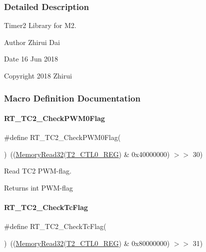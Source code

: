 \subsubsection{Detailed Description}
Timer2 Library for M2. 

\begin{DoxyAuthor}{Author}
Zhirui Dai 
\end{DoxyAuthor}
\begin{DoxyDate}{Date}
16 Jun 2018 
\end{DoxyDate}
\begin{DoxyCopyright}{Copyright}
2018 Zhirui 
\end{DoxyCopyright}


\subsubsection{Macro Definition Documentation}
\mbox{\label{a00047_a68bc636dca2736a8368cfd72ca9eb11a}} 
\paragraph{\texorpdfstring{R\+T\+\_\+\+T\+C2\+\_\+\+Check\+P\+W\+M0\+Flag}{RT\_TC2\_CheckPWM0Flag}}
{\footnotesize\ttfamily \#define R\+T\+\_\+\+T\+C2\+\_\+\+Check\+P\+W\+M0\+Flag(\begin{DoxyParamCaption}{ }\end{DoxyParamCaption})~((\mbox{\hyperlink{a00020_a2d484dc15bdf30ee11ab3b05f31f0e16}{Memory\+Read32}}(\mbox{\hyperlink{a00020_a5853553391e986211306d4f29ab31e47}{T2\+\_\+\+C\+T\+L0\+\_\+\+R\+EG}}) \& 0x40000000) $>$$>$ 30)}



Read T\+C2 P\+W\+M-\/flag. 

\begin{DoxyReturn}{Returns}
int P\+W\+M-\/flag 
\end{DoxyReturn}
\mbox{\label{a00047_ab9c273f7aaa4570b2a179b6711a50741}} 
\paragraph{\texorpdfstring{R\+T\+\_\+\+T\+C2\+\_\+\+Check\+Tc\+Flag}{RT\_TC2\_CheckTcFlag}}
{\footnotesize\ttfamily \#define R\+T\+\_\+\+T\+C2\+\_\+\+Check\+Tc\+Flag(\begin{DoxyParamCaption}{ }\end{DoxyParamCaption})~((\mbox{\hyperlink{a00020_a2d484dc15bdf30ee11ab3b05f31f0e16}{Memory\+Read32}}(\mbox{\hyperlink{a00020_a5853553391e986211306d4f29ab31e47}{T2\+\_\+\+C\+T\+L0\+\_\+\+R\+EG}}) \& 0x80000000) $>$$>$ 31)}



